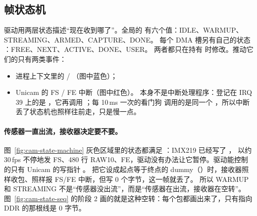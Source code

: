 \subsection{帧状态机}
\label{sec:cam-state}

驱动用两层状态描述“现在收到哪了”。全局的  有六个值：IDLE、WARMUP、STREAMING、ARMED、CAPTURE、DONE。
每个 DMA 槽另有自己的状态 ：FREE、NEXT、ACTIVE、DONE、USER。
两者都只在持有  时修改。推动它们的只有两类事件：

\begin{itemize}
  \item 进程上下文里的  / （图中蓝色）；
  \item Unicam 的 FS / FE 中断（图中红色）。 本身不是中断处理程序：登记在 IRQ 39 上的是 ，它再调用 ；每 10\,ms 一次的看门狗
         调用的是同一个 ，所以中断丢了状态机也照样往前走，只是慢一点。
\end{itemize}



\paragraph{传感器一直出流，接收器决定要不要。}
图~\ref{fig:cam-state-machine} 灰色区域里的状态都满足 ：IMX219 已经写了 ，
以约 30\,fps 不停地发 FS、480 行 RAW10、FE，驱动没有办法让它暂停。驱动能控制的只有 Unicam 的写指针 。
把它设成起点等于终点的 dummy（）时，接收器照样收包、照样报 FS/FE 中断，但写 0 个字节，这一帧就丢了。
所以 WARMUP 和 STREAMING 不是“传感器没出流”，而是“传感器在出流，接收器在空转”。
图~\ref{fig:cam-state-seq} 的阶段 2 画的就是这种空转：每个包都画出来了，只有指向 DDR 的那根线是 0 字节。



